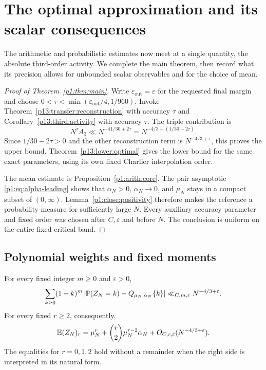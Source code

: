 \section{The optimal approximation and its scalar consequences}
\label{p13:optimal:section}

The arithmetic and probabilistic estimates now meet at a
single quantity, the absolute third-order activity.
We complete the main theorem, then record what its precision
allows for unbounded scalar observables and for the choice
of mean.

\begin{proof}[Proof of Theorem~\ref{p1:thm:main}]
Write $\varepsilon_{\mathrm{out}}=\varepsilon$ for the requested
final margin and choose
$0<\tau<\min(\varepsilon_{\mathrm{out}}/4,1/960)$.
Invoke Theorem~\ref{p13:transfer:reconstruction} with accuracy $\tau$
and Corollary~\ref{p13:third:activity} with accuracy $\tau$.
The triple contribution is
\[
 N^\tau A_3\ll N^{-41/30+2\tau}
       =N^{-4/3-(1/30-2\tau)}.
\]
Since $1/30-2\tau>0$ and the other reconstruction term is
$N^{-4/3+\tau}$, this proves the upper bound.
Theorem~\ref{p13:lower:optimal} gives the lower bound for the same
exact parameters, using its own fixed Charlier interpolation order.

The mean estimate is Proposition~\ref{p1:arith:core}.
The pair asymptotic \eqref{p1:eq:alpha-leading} shows
that \(\alpha_N>0\), \(\alpha_N\to0\), and \(\mu_N\)
stays in a compact subset of \((0,\infty)\).
Lemma~\ref{p1:close:positivity} therefore makes the
reference a probability measure for sufficiently large \(N\).
Every auxiliary accuracy parameter and fixed order was chosen after
\(C,\varepsilon\) and before \(N\). The conclusion
is uniform on the entire fixed critical band.
\end{proof}

\subsection{Polynomial weights and fixed moments}

\begin{corollary}
\label{p13:optimal:weighted}
For every fixed integer \(m\ge0\) and \(\varepsilon>0\),
\begin{equation}
 \sum_{k\ge0}(1+k)^m
   \left|\P(Z_N=k)-Q_{\mu_N,\alpha_N}\{k\}\right|
       \ll_{C,m,\varepsilon}N^{-4/3+\varepsilon}.
 \label{p13:optimal:weighted-bound}
\end{equation}
For every fixed \(r\ge2\), consequently,
\begin{equation}
 \E(Z_N)_r
 =\mu_N^r+\binom r2\mu_N^{r-2}\alpha_N
           +O_{C,r,\varepsilon}(N^{-4/3+\varepsilon}).
 \label{p13:optimal:moments}
\end{equation}
The equalities for \(r=0,1,2\) hold without a remainder
when the right side is interpreted in its natural form.
\end{corollary}

